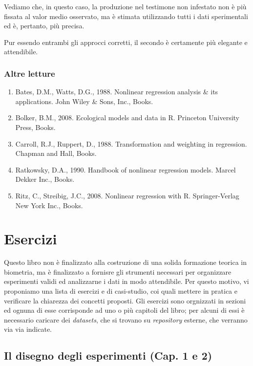 \documentclass[a4paper,12pt,oneside]{book}
\providecommand{\tightlist}{%
  \setlength{\itemsep}{0pt}\setlength{\parskip}{0pt}}
\begin{document}
Vediamo che, in questo caso, la produzione nel testimone non infestato non è più fissata al valor medio osservato, ma è stimata utilizzando tutti i dati sperimentali ed è, pertanto, più precisa.

Pur essendo entrambi gli approcci corretti, il secondo è certamente più elegante e attendibile.

\hypertarget{altre-letture-11}{%
\subsection{Altre letture}\label{altre-letture-11}}

\begin{enumerate}
\def\labelenumi{\arabic{enumi}.}
\tightlist
\item
  Bates, D.M., Watts, D.G., 1988. Nonlinear regression analysis \& its applications. John Wiley \& Sons, Inc., Books.
\item
  Bolker, B.M., 2008. Ecological models and data in R. Princeton University Press, Books.
\item
  Carroll, R.J., Ruppert, D., 1988. Transformation and weighting in regression. Chapman and Hall, Books.
\item
  Ratkowsky, D.A., 1990. Handbook of nonlinear regression models. Marcel Dekker Inc., Books.
\item
  Ritz, C., Streibig, J.C., 2008. Nonlinear regression with R. Springer-Verlag New York Inc., Books.
\end{enumerate}

\hypertarget{esercizi}{%
\chapter{Esercizi}\label{esercizi}}

Questo libro non è finalizzato alla costruzione di una solida formazione teorica in biometria, ma è finalizzato a fornisre gli strumenti necessari per organizzare esperimenti validi ed analizzarne i dati in modo attendibile.
Per questo motivo, vi proponiamo una lista di esercizi e di casi-studio, coi quali mettere in pratica e verificare la chiarezza dei concetti proposti. Gli esercizi sono orgnizzati in sezioni ed ognuna di esse corrisponde ad uno o più capitoli del libro; per alcuni di essi è necessario caricare dei \emph{datasets}, che si trovano su \emph{repository} esterne, che verranno via via indicate.

\hypertarget{il-disegno-degli-esperimenti-cap.-1-e-2}{%
\section{Il disegno degli esperimenti (Cap. 1 e 2)}\label{il-disegno-degli-esperimenti-cap.-1-e-2}}
\end{document}
